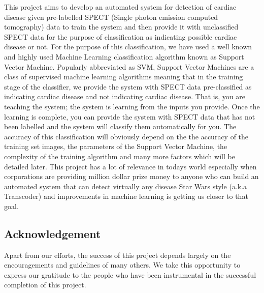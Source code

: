 \documentclass[11pt,a4paper]{report}
\begin{document}
{\justifying
\setlength{\parindent}{1cm}
This project aims to develop an automated system for detection of cardiac disease given pre-labelled SPECT (Single photon emission computed tomography) data to train the system and then provide it with unclassified SPECT data for the purpose of classification as indicating possible cardiac disease or not. For the purpose of this classification, we have used a well known and highly used Machine Learning classification algorithm known as Support Vector Machine. Popularly abbreviated as SVM, Support Vector Machines are a class of supervised machine learning algorithms meaning that in the training stage of the classifier, we provide the system with SPECT data pre-classified as indicating cardiac disease and not indicating cardiac disease. That is, you are teaching the system; the system is learning from the inputs you provide. Once the learning is complete, you can provide the system with SPECT data that has not been labelled and the system will classify them automatically for you. The accuracy of this classification will obviously depend on the the accuracy of the training set images, the parameters of the Support Vector Machine, the complexity of the training algorithm and many more factors which will be detailed later. This project has a lot of relevance in todays world especially when corporations are providing million dollar prize money to anyone who can build an automated system that can detect virtually any disease Star Wars style (a.k.a Transcoder) and improvements in machine learning is getting us closer to that goal.}



\begin{center}
\chapter*{Acknowledgement}
\end{center}

{\justifying
\setlength{\parindent}{1cm}
Apart from our efforts, the success of this project depends largely on the encouragements and guidelines of many others. We take this opportunity to express our gratitude to the people who have been instrumental in the successful completion of this project. \\}
\end{document}
